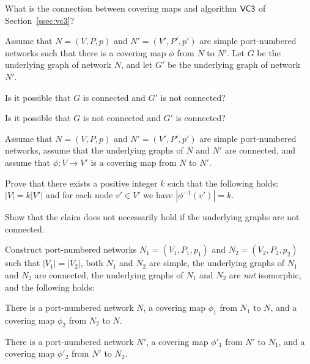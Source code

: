 \begin{ex}\label{ex:cover-cover}
    What is the connection between covering maps and algorithm $\textsf{VC3}$ of Section~\ref{ssec:vc3}?
\end{ex}

\begin{ex}
    Assume that $N = (V,P,p)$ and $N' = (V'\!,P'\!,p')$ are simple port-numbered networks such that there is a covering map $\phi$ from $N$ to $N'$. Let $G$ be the underlying graph of network $N$, and let $G'$ be the underlying graph of network~$N'$.
    \begin{subex}
        \item Is it possible that $G$ is connected and $G'$ is not connected?
        \item Is it possible that $G$ is not connected and $G'$ is connected?
    \end{subex}
\end{ex}

\begin{ex}
    Assume that $N = (V,P,p)$ and $N' = (V'\!,P'\!,p')$ are simple port-numbered networks,
    assume that the underlying graphs of $N$ and $N'$ are connected, and
    assume that $\phi\colon V \to V'$ is a covering map from $N$ to $N'$.

    Prove that there exists a positive integer $k$ such that the following holds:
    $|V| = k |V'|$ and for each node $v' \in V'$ we have $|\phi^{-1}(v')| = k$.

    Show that the claim does not necessarily hold if the underlying graphs are not connected.
\end{ex}

\begin{ex}[isomorphisms]
    Construct port-numbered networks $N_1 \allowbreak = (V_1,P_1,p_1)$ and $N_2 = (V_2,P_2,p_2)$ such that $|V_1| = |V_2|$, both $N_1$ and $N_2$ are simple, the underlying graphs of $N_1$ and $N_2$ are connected, the underlying graphs of $N_1$ and $N_2$ are \emph{not} isomorphic, and the following holds:
    \begin{subex}
        \item There is a port-numbered network $N$, a covering map $\phi_1$ from $N_1$ to $N$, and a covering map $\phi_2$ from $N_2$ to $N$.
        \item There is a port-numbered network $N'$, a covering map $\phi'_1$ from $N'$ to $N_1$, and a covering map $\phi'_2$ from $N'$ to $N_2$.
    \end{subex}
\end{ex}


